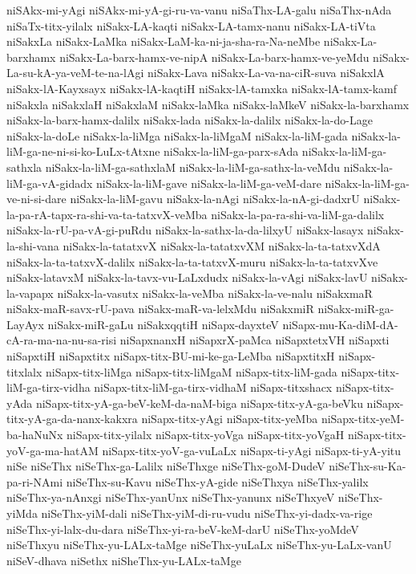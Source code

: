 {niSAkx-mi-yAgi
niSAkx-mi-yA-gi-ru-va-vanu
niSaThx-LA-galu
niSaThx-nAda
niSaTx-titx-yilalx
niSakx-LA-kaqti
niSakx-LA-tamx-nanu
niSakx-LA-tiVta
niSakxLa
niSakx-LaMka
niSakx-LaM-ka-ni-ja-sha-ra-Na-neMbe
niSakx-La-barxhamx
niSakx-La-barx-hamx-ve-nipA
niSakx-La-barx-hamx-ve-yeMdu
niSakx-La-su-kA-ya-veM-te-na-lAgi
niSakx-Lava
niSakx-La-va-na-ciR-suva
niSakxlA
niSakx-lA-Kayxsayx
niSakx-lA-kaqtiH
niSakx-lA-tamxka
niSakx-lA-tamx-kamf
niSakxla
niSakxlaH
niSakxlaM
niSakx-laMka
niSakx-laMkeV
niSakx-la-barxhamx
niSakx-la-barx-hamx-dalilx
niSakx-lada
niSakx-la-dalilx
niSakx-la-do-Lage
niSakx-la-doLe
niSakx-la-liMga
niSakx-la-liMgaM
niSakx-la-liM-gada
niSakx-la-liM-ga-ne-ni-si-ko-LuLx-tAtxne
niSakx-la-liM-ga-parx-sAda
niSakx-la-liM-ga-sathxla
niSakx-la-liM-ga-sathxlaM
niSakx-la-liM-ga-sathx-la-veMdu
niSakx-la-liM-ga-vA-gidadx
niSakx-la-liM-gave
niSakx-la-liM-ga-veM-dare
niSakx-la-liM-ga-ve-ni-si-dare
niSakx-la-liM-gavu
niSakx-la-nAgi
niSakx-la-nA-gi-dadxrU
niSakx-la-pa-rA-tapx-ra-shi-va-ta-tatxvX-veMba
niSakx-la-pa-ra-shi-va-liM-ga-dalilx
niSakx-la-rU-pa-vA-gi-puRdu
niSakx-la-sathx-la-da-lilxyU
niSakx-lasayx
niSakx-la-shi-vana
niSakx-la-tatatxvX
niSakx-la-tatatxvXM
niSakx-la-ta-tatxvXdA
niSakx-la-ta-tatxvX-dalilx
niSakx-la-ta-tatxvX-muru
niSakx-la-ta-tatxvXve
niSakx-latavxM
niSakx-la-tavx-vu-LaLxdudx
niSakx-la-vAgi
niSakx-lavU
niSakx-la-vapapx
niSakx-la-vasutx
niSakx-la-veMba
niSakx-la-ve-nalu
niSakxmaR
niSakx-maR-savx-rU-pava
niSakx-maR-va-lelxMdu
niSakxmiR
niSakx-miR-ga-LayAyx
niSakx-miR-gaLu
niSakxqqtiH
niSapx-dayxteV
niSapx-mu-Ka-diM-dA-cA-ra-ma-na-nu-sa-risi
niSapxnanxH
niSapxrX-paMca
niSapxtetxVH
niSapxti
niSapxtiH
niSapxtitx
niSapx-titx-BU-mi-ke-ga-LeMba
niSapxtitxH
niSapx-titxlalx
niSapx-titx-liMga
niSapx-titx-liMgaM
niSapx-titx-liM-gada
niSapx-titx-liM-ga-tirx-vidha
niSapx-titx-liM-ga-tirx-vidhaM
niSapx-titxshacx
niSapx-titx-yAda
niSapx-titx-yA-ga-beV-keM-da-naM-biga
niSapx-titx-yA-ga-beVku
niSapx-titx-yA-ga-da-nanx-kakxra
niSapx-titx-yAgi
niSapx-titx-yeMba
niSapx-titx-yeM-ba-haNuNx
niSapx-titx-yilalx
niSapx-titx-yoVga
niSapx-titx-yoVgaH
niSapx-titx-yoV-ga-ma-hatAM
niSapx-titx-yoV-ga-vuLaLx
niSapx-ti-yAgi
niSapx-ti-yA-yitu
niSe
niSeThx
niSeThx-ga-Lalilx
niSeThxge
niSeThx-goM-DudeV
niSeThx-su-Ka-pa-ri-NAmi
niSeThx-su-Kavu
niSeThx-yA-gide
niSeThxya
niSeThx-yalilx
niSeThx-ya-nAnxgi
niSeThx-yanUnx
niSeThx-yanunx
niSeThxyeV
niSeThx-yiMda
niSeThx-yiM-dali
niSeThx-yiM-di-ru-vudu
niSeThx-yi-dadx-va-rige
niSeThx-yi-lalx-du-dara
niSeThx-yi-ra-beV-keM-darU
niSeThx-yoMdeV
niSeThxyu
niSeThx-yu-LALx-taMge
niSeThx-yuLaLx
niSeThx-yu-LaLx-vanU
niSeV-dhava
niSethx
niSheThx-yu-LALx-taMge
}
